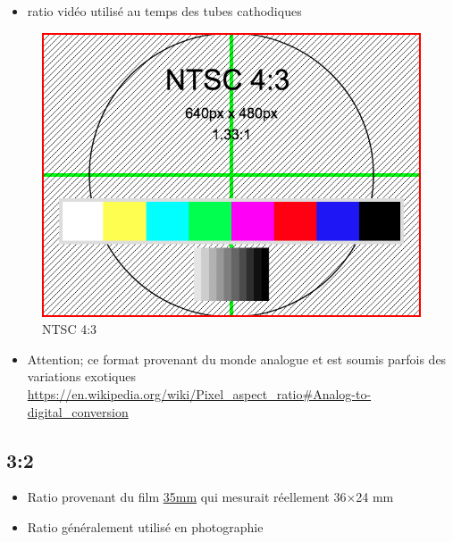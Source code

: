 \documentclass[
  french,
]{book}
\providecommand{\tightlist}{%
  \setlength{\itemsep}{0pt}\setlength{\parskip}{0pt}}
\begin{document}
\begin{itemize}
\tightlist
\item
  ratio vidéo utilisé au temps des tubes cathodiques
\end{itemize}

\begin{figure}
\centering
\includegraphics{medias/lexique/NTSC_4_3_640x480.png}
\caption{NTSC 4:3}
\end{figure}

\begin{itemize}
\tightlist
\item
  Attention; ce format provenant du monde analogue et est soumis parfois des variations exotiques
  \url{https://en.wikipedia.org/wiki/Pixel_aspect_ratio\#Analog-to-digital_conversion}
\end{itemize}

\hypertarget{section-3}{%
\subsection{3:2}\label{section-3}}

\begin{itemize}
\item
  Ratio provenant du film \href{https://en.wikipedia.org/wiki/35_mm_format}{35mm} qui mesurait réellement 36×24 mm
\item
  Ratio généralement utilisé en photographie
\end{itemize}
\end{document}
